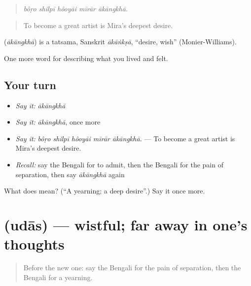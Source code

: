 \begin{quote}
\emph{bôṛo shilpī hôoyāi mīrār ākāngkhā.}
\end{quote}

\begin{quote}
To become a great artist is Mira's deepest desire.
\end{quote}

\begin{cousinweb}
\textbf{} (\emph{ākāngkhā}) is a tatsama, Sanskrit \emph{ākāṅkṣā}, \textquotedblleft{}desire, wish\textquotedblright{} (Monier-Williams).
\end{cousinweb}

\begin{grammarlens}[title={What you've built}]
One more word for describing what you lived and felt.
\end{grammarlens}

\subsection*{Your turn}
\begin{itemize}
\raggedright
  \item \emph{Say it:} \emph{ākāngkhā}
  \item \emph{Say it:} \emph{ākāngkhā}, once more
  \item \emph{Say it:} \emph{bôṛo shilpī hôoyāi mīrār ākāngkhā.} — To become a great artist is Mira's deepest desire.
  \item \emph{Recall:} say the Bengali for to admit, then the Bengali for the pain of separation, then say \emph{ākāngkhā} again
\end{itemize}

\begin{tcolorbox}[breakable,colback=teal!4,colframe=teal!35!black,title={Before you move on}]
What does  mean? (\textquotedblleft{}A yearning; a deep desire\textquotedblright{}.) Say it once more.
\end{tcolorbox}
\section[\texorpdfstring{\bn{উদাস} (udās)}{উদাস (udās)}]{ (udās) — wistful; far away in one's thoughts}

\label{lesson:BN-C448-udas}



\begin{quote}
Before the new one: say the Bengali for the pain of separation, then the Bengali for a yearning.
\end{quote}

